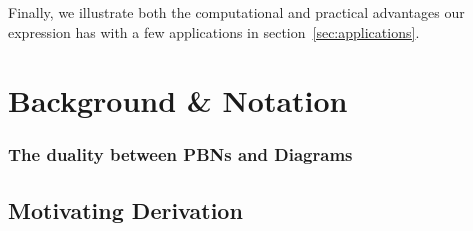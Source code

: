 \documentclass[10pt]{article}
\numberwithin{equation}{section}
\newcommand{\+}{%
	\raisebox{0.18ex}{\scaleobj{0.55}{+}}
}
\theoremstyle{definition}
\begin{document}
Finally, we illustrate both the computational and practical advantages our expression has with a few applications in section~\ref{sec:applications}. 


\section{Background \& Notation}\label{sec:background_notation}


\subsubsection*{The duality between PBNs and Diagrams}\label{sec:duality_pbn_dgm}



\subsection{Motivating Derivation}\label{sec:betti_derivation}
\end{document}

